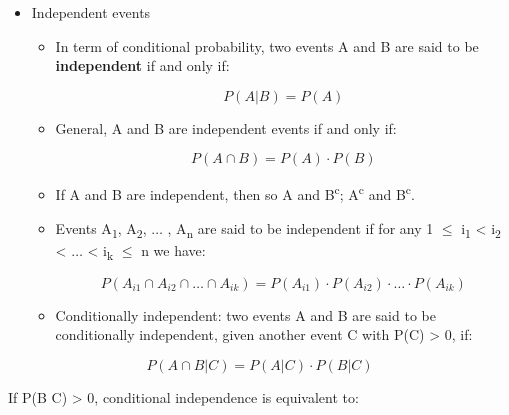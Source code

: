 \documentclass[12pt]{report}
\renewcommand{\_}{\kern-1.5pt\textunderscore\kern-1.5pt}
\begin{document}
\begin{itemize}
\begin{itemize}
\end{itemize}
	\item Independent events\par

\begin{itemize}
	\item In term of conditional probability, two events A and B are said to be \textbf{independent} if and only if:\par

 \[ P \left( A \vert B \right) =P \left( A \right)  \] \par

	\item General, A and B are independent events if and only if:\par

 \[ P \left( A \cap B \right) =P \left( A \right)  \cdot P \left( B \right)  \] \par

	\item If A and B are independent, then so A and B\textsuperscript{c}; A\textsuperscript{c} and B\textsuperscript{c}.\par

	\item Events A\textsubscript{1}, A\textsubscript{2}, $ \ldots $ , A\textsubscript{n} are said to be independent if for any 1 $ \leq $  i\textsubscript{1} < i\textsubscript{2} < $ \ldots $  < i\textsubscript{k} $ \leq $  n we have: \par

 \[ P \left( A_{i1} \cap A_{i2} \cap  \ldots  \cap A_{ik} \right) =P \left( A_{i1} \right)  \cdot P \left( A_{i2} \right)  \cdot  \ldots  \cdot P \left( A_{ik} \right)  \] \par

	\item Conditionally independent: two events A and B are said to be conditionally independent, given another event C with P(C) > 0, if:
\end{itemize}
\end{itemize}\par

\begin{adjustwidth}{1.0in}{0.0in}
 \[ P \left( A \cap B \vert C \right) =P \left( A \vert C \right)  \cdot P \left( B \vert C \right)  \] \par

\end{adjustwidth}

\begin{adjustwidth}{1.0in}{0.0in}
If P(B  C) > 0, conditional independence is equivalent to:\par

\end{adjustwidth}
\end{document}
